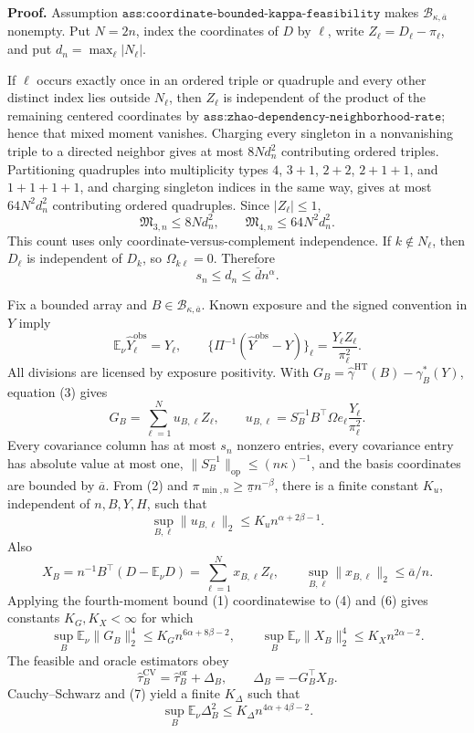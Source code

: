 \textbf{Proof.}
Assumption \(\texttt{ass:coordinate-bounded-kappa-feasibility}\) makes \(\mathcal B_{\kappa,\overline a}\) nonempty.  Put \(N=2n\), index the coordinates of \(D\) by \(\ell\), write \(Z_\ell=D_\ell-\pi_\ell\), and put \(d_n=\max_\ell|N_\ell|\).

If \(\ell\) occurs exactly once in an ordered triple or quadruple and every other distinct index lies outside \(N_\ell\), then \(Z_\ell\) is independent of the product of the remaining centered coordinates by \(\texttt{ass:zhao-dependency-neighborhood-rate}\); hence that mixed moment vanishes.  Charging every singleton in a nonvanishing triple to a directed neighbor gives at most \(8Nd_n^2\) contributing ordered triples.  Partitioning quadruples into multiplicity types \(4\), \(3+1\), \(2+2\), \(2+1+1\), and \(1+1+1+1\), and charging singleton indices in the same way, gives at most \(64N^2d_n^2\) contributing ordered quadruples.  Since \(|Z_\ell|\le1\),
\[
\mathfrak M_{3,n}\le8Nd_n^2,
\qquad
\mathfrak M_{4,n}\le64N^2d_n^2.
\tag{1}
\]
This count uses only coordinate-versus-complement independence.  If \(k\notin N_\ell\), then \(D_\ell\) is independent of \(D_k\), so \(\Omega_{k\ell}=0\).  Therefore
\[
s_n\le d_n\le\overline d n^\alpha.
\tag{2}
\]

Fix a bounded array and \(B\in\mathcal B_{\kappa,\overline a}\).  Known exposure and the signed convention in \(Y\) imply
\[
\mathbb E_\nu\widehat Y_\ell^{\mathrm{obs}}=Y_\ell,
\qquad
\{\Pi^{-1}(\widehat Y^{\mathrm{obs}}-Y)\}_\ell
=\frac{Y_\ell Z_\ell}{\pi_\ell^2}.
\tag{3}
\]
All divisions are licensed by exposure positivity.  With \(G_B=\widehat\gamma^{\mathrm{HT}}(B)-\gamma_B^*(Y)\), equation (3) gives
\[
G_B=\sum_{\ell=1}^Nu_{B,\ell}Z_\ell,
\qquad
u_{B,\ell}=S_B^{-1}B^{\top}\Omega e_\ell\frac{Y_\ell}{\pi_\ell^2}.
\tag{4}
\]
Every covariance column has at most \(s_n\) nonzero entries, every covariance entry has absolute value at most one, \(\lVert S_B^{-1}\rVert_{\mathrm{op}}\le(n\kappa)^{-1}\), and the basis coordinates are bounded by \(\overline a\).  From (2) and \(\pi_{\min,n}\ge\underline\pi n^{-\beta}\), there is a finite constant \(K_u\), independent of \(n,B,Y,H\), such that
\[
\sup_{B,\ell}\lVert u_{B,\ell}\rVert_2
\le K_un^{\alpha+2\beta-1}.
\tag{5}
\]
Also
\[
X_B=n^{-1}B^{\top}(D-\mathbb E_\nu D)
=\sum_{\ell=1}^Nx_{B,\ell}Z_\ell,
\qquad
\sup_{B,\ell}\lVert x_{B,\ell}\rVert_2\le\overline a/n.
\tag{6}
\]
Applying the fourth-moment bound (1) coordinatewise to (4) and (6) gives constants \(K_G,K_X<\infty\) for which
\[
\sup_B\mathbb E_\nu\lVert G_B\rVert_2^4
\le K_Gn^{6\alpha+8\beta-2},
\qquad
\sup_B\mathbb E_\nu\lVert X_B\rVert_2^4
\le K_Xn^{2\alpha-2}.
\tag{7}
\]
The feasible and oracle estimators obey
\[
\widehat\tau_B^{\mathrm{CV}}=\widehat\tau_B^{\mathrm{or}}+\Delta_B,
\qquad \Delta_B=-G_B^{\top}X_B.
\tag{8}
\]
Cauchy--Schwarz and (7) yield a finite \(K_\Delta\) such that
\[
\sup_B\mathbb E_\nu\Delta_B^2
\le K_\Delta n^{4\alpha+4\beta-2}.
\tag{9}
\]

